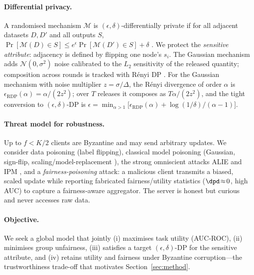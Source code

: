 \paragraph{Differential privacy.}
A randomised mechanism $\mathcal{M}$ is $(\epsilon,\delta)$-differentially
private if for all adjacent datasets $D,D'$ and all outputs $S$,
$\Pr[\mathcal{M}(D)\in S]\le e^{\epsilon}\Pr[\mathcal{M}(D')\in S]+\delta$
\cite{dwork2014algorithmic}. We protect the \emph{sensitive attribute}:
adjacency is defined by flipping one node's $s_i$. The Gaussian mechanism adds
$\mathcal{N}(0,\sigma^2)$ noise calibrated to the $L_2$ sensitivity of the
released quantity; composition across rounds is tracked with R\'enyi DP
\cite{mironov2017renyi}. For the Gaussian mechanism with noise multiplier
$z=\sigma/\Delta$, the R\'enyi divergence of order $\alpha$ is
$\epsilon_{\mathrm{RDP}}(\alpha)=\alpha/(2z^2)$; over $T$ releases it composes as
$T\alpha/(2z^2)$, and the tight conversion to $(\epsilon,\delta)$-DP is
$\epsilon=\min_{\alpha>1}\big[\epsilon_{\mathrm{RDP}}(\alpha)+\log(1/\delta)/(\alpha-1)\big]$.

\paragraph{Threat model for robustness.}
Up to $f<K/2$ clients are Byzantine and may send arbitrary updates. We consider
data poisoning (label flipping), classical model poisoning (Gaussian, sign-flip,
scaling/model-replacement \cite{bagdasaryan2020backdoor}), the strong
omniscient attacks ALIE \cite{baruch2019little} and IPM \cite{xie2019fall},
and a \emph{fairness-poisoning} attack: a malicious client transmits a biased,
scaled update while reporting fabricated fairness/utility statistics
($\dpd\!\approx\!0$, high AUC) to capture a fairness-aware aggregator. The
server is honest but curious and never accesses raw data.

\paragraph{Objective.}
We seek a global model that jointly (i) maximises task utility (AUC-ROC), (ii)
minimises group unfairness, (iii) satisfies a target $(\epsilon,\delta)$-DP for
the sensitive attribute, and (iv) retains utility and fairness under Byzantine
corruption---the trustworthiness trade-off that motivates
Section~\ref{sec:method}.

